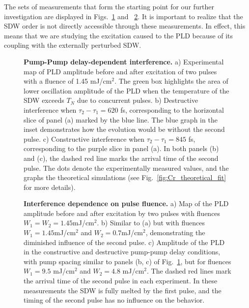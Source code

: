 The sets of measurements that form the starting point for our further investigation are displayed in Figs.~\ref{fig:Cr_experimental1} and ~\ref{fig:Cr_experimental2}.
It is important to realize that the SDW order is not directly accessible through these measurements. In effect, this means that we are studying the excitation caused to the PLD because of its coupling with the externally perturbed SDW.
\begin{figure}
	\centering
{}
\caption{\label{fig:Cr_experimental1}{\bf Pump-Pump delay-dependent interference.} a) Experimental map of PLD amplitude before and after excitation of two pulses with a fluence of 1.45 mJ/cm$^2$. The green box highlights the area of lower oscillation amplitude of the PLD when the temperature of the SDW exceeds $T_N$ due to concurrent pulses. b) Destructive interference when $\tau_2 - \tau_1 = 620$ fs, corresponding to the horizontal slice of panel (a) marked by the blue line. The blue graph in the inset demonstrates how the evolution would be without the second pulse. c) Constructive interference when $\tau_2 - \tau_1 = 845$ fs, corresponding to the purple slice in panel (a). In both panels (b) and (c), the dashed red line marks the arrival time of the second pulse. The dots denote the experimentally measured values, and the graphs the theoretical simulations (see Fig.~\ref{fig:Cr_theoretical_fit} for more details).}
\end{figure}
\begin{figure}
	\centering
{}
\caption{\label{fig:Cr_experimental2}{\bf Interference dependence on pulse fluence.} a) Map of the PLD amplitude before and after excitation by two pulses with fluences $W_1=W_2=1.45$mJ/cm$^2$. b) Similar to (a) but with fluences $W_1=1.45$mJ/cm$^2$ and $W_2=0.7$mJ/cm$^2$, demonstrating the diminished influence of the second pulse. c) Amplitude of the PLD in the constructive and destructive pump-pump delay conditions, with pump spacing similar to panels (b, c) of Fig.~\ref{fig:Cr_experimental1}, but for fluences $W_1 = 9.5$ mJ/cm$^2$ and $W_2 = 4.8$ mJ/cm$^2$. The dashed red lines mark the arrival time of the second pulse in each experiment. In these measurements the SDW is fully melted by the first pulse, and the timing of the second pulse has no influence on the behavior.}
\end{figure}


